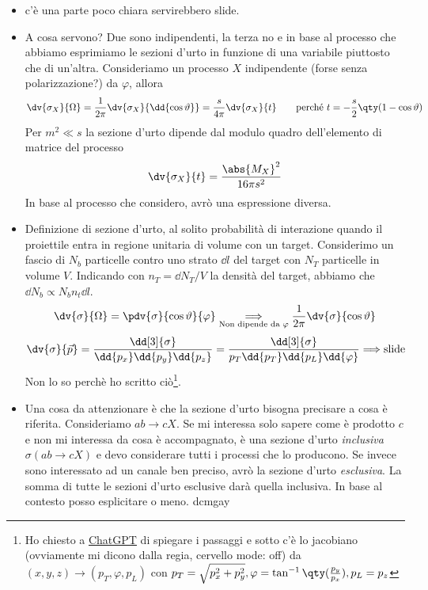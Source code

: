 \begin{itemize}
        \item c'è una parte poco chiara servirebbero slide.
        \item A cosa servono? Due sono indipendenti, la terza no e in base al processo che abbiamo esprimiamo le sezioni d'urto in funzione di una variabile piuttosto che di un'altra. Consideriamo un processo $X$ indipendente (forse senza polarizzazione?) da $\varphi$, allora 
        \begin{equation*}
        \dv{\sigma_X}{\Omega}=\frac1{2\pi}\dv{\sigma_X}{\dd{\cos\vartheta}}=\frac s{4\pi}\dv{\sigma_X}{t}\qquad \text{perché }t=-\frac s2\qty(1-\cos\vartheta)
        \end{equation*}
        Per $m^2\ll s$ la sezione d'urto dipende dal modulo quadro dell'elemento di matrice del processo
        \begin{equation*}
        \dv{\sigma_X}{t}=\frac{\abs{M_X}^2}{16\pi s^2}
        \end{equation*}
        In base al processo che considero, avrò una espressione diversa.
        \item Definizione di sezione d'urto, al solito probabilità di interazione quando il proiettile entra in regione unitaria di volume con un target. Considerimo un fascio di $N_b$ particelle contro uno strato $\dd l$ del target con $N_T$ particelle in volume $V$. Indicando con $n_T=\dd N_T/V$ la densità del target, abbiamo che $\dd{N_b}\propto N_b n_t\dd{l}$. 
        \begin{equation*}
        \dv{\sigma}{\Omega }=\pdv{\sigma}{\cos\vartheta}{\varphi}\underset{\text{Non dipende da } \varphi}{\Longrightarrow}\frac1{2\pi}\dv{\sigma}{\cos\vartheta}
        \end{equation*}
        \begin{equation*}
        \dv{\sigma}{\vec p}=\frac{\dd[3]{\sigma}}{\dd{p_x}\dd{p_y}\dd{p_z}}=\frac{\dd[3]{\sigma}}{p_T\dd{p_T}\dd{p_L}\dd{\varphi}}\Longrightarrow \text{slide}
        \end{equation*}
        Non lo so perchè ho scritto ciò\footnote{Ho chiesto a \href{https://chatgpt.com/share/672ba43f-ff50-800b-bc35-8bc186c6df2a}{ChatGPT} di spiegare i passaggi e sotto c'è lo jacobiano  (ovviamente mi dicono dalla regia, cervello mode: off) da $(x,y,z)\to(p_T,\varphi,p_L)$ con $p_T=\sqrt{p_x^2+p_y^2},\varphi=\tan^{-1}\qty(\frac{p_y}{p_x}),p_L=p_z$}.
        \item Una cosa da attenzionare è che la sezione d'urto bisogna precisare a cosa è riferita. Consideriamo $ab\to cX$. Se mi interessa solo sapere come è prodotto $c$ e non mi interessa da cosa è accompagnato, è una sezione d'urto \textit{inclusiva} $\sigma(ab\to cX)$ e devo considerare tutti i processi che lo producono. Se invece sono interessato ad un canale ben preciso, avrò la sezione d'urto \textit{esclusiva}. La somma di tutte le sezioni d'urto esclusive darà quella inclusiva. In base al contesto posso esplicitare o meno. dcmgay
\end{itemize}